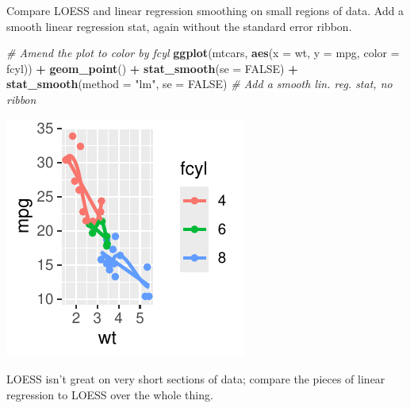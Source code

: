 \documentclass[
  ignorenonframetext,
]{beamer}
\newenvironment{Shaded}{\begin{snugshade}}{\end{snugshade}}
\newcommand{\AttributeTok}[1]{\textcolor[rgb]{0.13,0.29,0.53}{#1}}
\newcommand{\CommentTok}[1]{\textcolor[rgb]{0.56,0.35,0.01}{\textit{#1}}}
\newcommand{\ConstantTok}[1]{\textcolor[rgb]{0.56,0.35,0.01}{#1}}
\newcommand{\FunctionTok}[1]{\textcolor[rgb]{0.13,0.29,0.53}{\textbf{#1}}}
\newcommand{\NormalTok}[1]{#1}
\newcommand{\SpecialCharTok}[1]{\textcolor[rgb]{0.81,0.36,0.00}{\textbf{#1}}}
\newcommand{\StringTok}[1]{\textcolor[rgb]{0.31,0.60,0.02}{#1}}
\begin{document}
\begin{frame}[fragile]{Compare LOESS and linear regression smoothing on
small regions of data.}
\label{compare-loess-and-linear-regression-smoothing-on-small-regions-of-data.-1}
Add a smooth linear regression stat, again without the standard error
ribbon.


\begin{Shaded}
\begin{Highlighting}[]
\CommentTok{\# Amend the plot to color by fcyl}
\FunctionTok{ggplot}\NormalTok{(mtcars, }\FunctionTok{aes}\NormalTok{(}\AttributeTok{x =}\NormalTok{ wt, }\AttributeTok{y =}\NormalTok{ mpg, }\AttributeTok{color =}\NormalTok{ fcyl)) }\SpecialCharTok{+} \FunctionTok{geom\_point}\NormalTok{() }\SpecialCharTok{+}
    \FunctionTok{stat\_smooth}\NormalTok{(}\AttributeTok{se =} \ConstantTok{FALSE}\NormalTok{) }\SpecialCharTok{+} \FunctionTok{stat\_smooth}\NormalTok{(}\AttributeTok{method =} \StringTok{"lm"}\NormalTok{, }\AttributeTok{se =} \ConstantTok{FALSE}\NormalTok{)  }\CommentTok{\# Add a smooth lin. reg. stat, no ribbon}
\end{Highlighting}
\end{Shaded}

\begin{center}\includegraphics[width=0.5\linewidth]{Figs/unnamed-chunk-12-1} \end{center}

LOESS isn't great on very short sections of data; compare the pieces of
linear regression to LOESS over the whole thing.
\end{frame}
\end{document}
